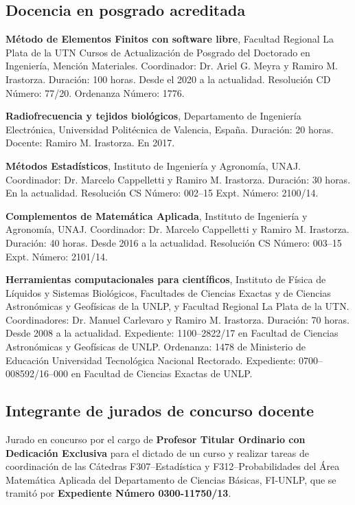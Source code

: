 \documentclass[margin,line]{res}
\begin{document}
\begin{resume}
\subsection{ Docencia en posgrado acreditada}

{\bf Método de Elementos Finitos con software libre}, Facultad Regional La Plata de la UTN Cursos de Actualización de Posgrado del Doctorado en Ingeniería, Mención Materiales. Coordinador: Dr. Ariel G. Meyra y Ramiro M. Irastorza. Duración: 100 horas. Desde el 2020 a la actualidad. Resolución CD Número: 77/20. Ordenanza Número: 1776.

{\bf Radiofrecuencia y tejidos biológicos}, Departamento de Ingeniería Electrónica, Universidad Politécnica de Valencia, España. Duración: 20 horas. Docente: Ramiro M. Irastorza. En 2017.

{\bf Métodos Estadísticos}, Instituto de Ingeniería y Agronomía, UNAJ. Coordinador: Dr. Marcelo Cappelletti y Ramiro M. Irastorza. Duración: 30 horas.  En la actualidad. Resolución CS Número: 002--15 Expt. Número: 2100/14.

{\bf Complementos de Matemática Aplicada}, Instituto de Ingeniería y Agronomía, UNAJ. Coordinador: Dr. Marcelo Cappelletti y Ramiro M. Irastorza. Duración: 40 horas.  Desde 2016 a la actualidad. Resolución CS Número: 003--15 Expt. Número: 2101/14.

{\bf Herramientas computacionales para científicos}, Instituto de Física de Líquidos y Sistemas Biológicos, Facultades de Ciencias Exactas y de Ciencias Astronómicas y Geofísicas de la UNLP, y Facultad Regional La Plata de la UTN. Coordinadores: Dr. Manuel Carlevaro y Ramiro M. Irastorza. Duración: 70 horas. Desde 2008 a la actualidad. Expediente: 1100--2822/17 en Facultad de Ciencias Astronómicas y Geofísicas de UNLP. Ordenanza: 1478 de Ministerio de Educación Universidad Tecnológica Nacional Rectorado. Expediente: 0700--008592/16--000 en Facultad de Ciencias Exactas de UNLP.


\subsection{ Integrante de jurados de concurso docente}

Jurado en concurso por el cargo de {\bf Profesor Titular Ordinario con Dedicación Exclusiva} para el dictado de un curso y realizar tareas de coordinación de las Cátedras  F307--Estadística y F312--Probabilidades del Área Matemática Aplicada del Departamento de Ciencias Básicas, FI-UNLP, que se tramitó por {\bf Expediente Número 0300-11750/13}.


\end{resume}
\end{document}

